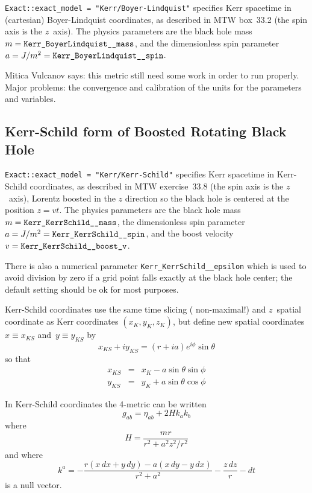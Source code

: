 \verb|Exact::exact_model = "Kerr/Boyer-Lindquist"| specifies Kerr
spacetime in (cartesian) Boyer-Lindquist coordinates, as described
in MTW box~33.2 (the spin axis is the $z$~axis).  The physics parameters
are the black hole mass $m = \verb|Kerr_BoyerLindquist__mass|$, and the
dimensionless spin parameter $a = J/m^2 = \verb|Kerr_BoyerLindquist__spin|$.

Mitica Vulcanov says: this metric still need some work in order to
run properly. Major problems: the convergence and calibration of the
units for the parameters and variables.  


\subsection{Kerr-Schild form of Boosted Rotating Black Hole}

\verb|Exact::exact_model = "Kerr/Kerr-Schild"| specifies Kerr spacetime
in Kerr-Schild coordinates, as described in MTW exercise~33.8 (the spin
axis is the $z$~axis), Lorentz boosted in the $z$ direction so the
black hole is centered at the position $z = vt$.  The physics parameters
are the black hole mass $m = \verb|Kerr_KerrSchild__mass|$, the
dimensionless spin parameter $a = J/m^2 = \verb|Kerr_KerrSchild__spin|$,
and the boost velocity $v = \verb|Kerr_KerrSchild__boost_v|$.

There is also a numerical parameter \verb|Kerr_KerrSchild__epsilon|
which is used to avoid division by zero if a grid point falls exactly
at the black hole center; the default setting should be ok for most
purposes.

Kerr-Schild coordinates use the same time slicing (\nb{} non-maximal!)
and $z$~spatial coordinate as Kerr coordinates $(x_K, y_K, z_K)$, but
define new spatial coordinates $x \equiv x_{KS}$ and~$y \equiv y_{KS}$
by
\begin{equation}
x_{KS} + iy_{KS} = (r + ia) e^{i\phi} \sin\theta
\end{equation}
so that
\begin{eqnarray}
x_{KS}	& = & x_K - a \sin\theta \sin\phi				\\
y_{KS}	& = & y_K + a \sin\theta \cos\phi				%
\end{eqnarray}

In Kerr-Schild coordinates the 4-metric can be written
\begin{equation}
g_{ab} = \eta_{ab} + 2 H k_a k_b
\end{equation}
where
\begin{equation}
H = \frac{mr}{r^2 + a^2z^2/r^2}
\end{equation}
and where
\begin{equation}
k^a = - \frac{r(x\,dx + y\,dy) - a(x\,dy - y\,dx)}{r^2 + a^2}
      - \frac{z\,dz}{r}
      - dt
\end{equation}
is a null vector.

